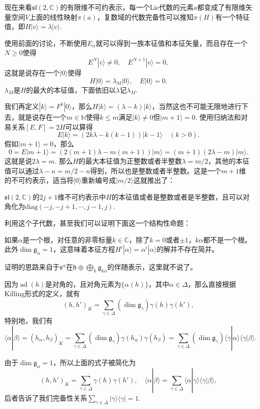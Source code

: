 \documentclass[11pt]{article}
\theoremstyle{definition}
\theoremstyle{plain}
\newcommand{\cc}{\mathbb{C}}
\newcommand{\lag}{{\mathfrak{g}}}
\DeclareMathOperator{\ad}{ad}
\begin{document}
\para 现在来看$\mathfrak{sl}(2,\cc)$的有限维不可约表示，每一个Lie代数的元素$a$都变成了有限维矢量空间$V$上面的线性映射$\pi(a)$，复数域的代数完备性可以推知$\pi(H)$有一个特征值，即$H|v\rangle=\lambda |v\rangle$.

使用前面的讨论，不断使用$E_\alpha$就可以得到一族本征值和本征矢量，而且存在一个$N\geq 0$使得
\[
	E^N|v\rangle\neq 0,\quad E^{N+1}|v\rangle =0,
\]
这就是说存在一个$|0\rangle$使得
\[
	H|0\rangle =\lambda_M |0\rangle,\quad E|0\rangle =0.
\]
$\lambda_M$是$H$的最大的本征值，下面依旧以$\lambda$记$\lambda_M$.

我们再定义$|k\rangle=F^k|0\rangle$，那么$H|k\rangle=(\lambda-k) |k\rangle$，当然这也不可能无限地进行下去，就是说存在一个$m\in \mathbb{N}$使得$k\leq m$满足$|k\rangle\neq 0$但$|m+1\rangle=0$. 使用归纳法和对易关系$[E,F]=2H$可以算得
\[
E|k\rangle=(2k\lambda -k(k-1)) |k-1\rangle\quad (k>0).
\]
假如$|m+1\rangle =0$，那么
\[
0=E|m+1\rangle=(2(m+1)\lambda -m(m+1)) |m\rangle =(m+1)(2\lambda-m)|m\rangle.
\]
这就是说$2\lambda=m$. 那么$H$的最大本征值为正整数或者半整数$\lambda=m/2$，其他的本征值可以通过$\lambda-n=m/2-n$得到，所以也是整数或者半整数。这是一个$m+1$维的不可约表示，适当将$|0\rangle$重新编号成$|m/2\rangle$这就推出了：

{\pro $\mathfrak{sl}(2,\cc)$的$2j+1$维不可约表示中$H$的本征值或者是整数或者是半整数，且可以对角化为$\mathrm{diag}(-j,-j+1,\cdots,j-1,j)$. \endpro}

利用这个子代数，甚至我们可以证明下面这一个结构性命题：

{\pro 如果$\alpha$是一个根，对任意的非零标量$k\in \cc$，除了$k=0$或者$\pm 1$，$k\alpha$都不是一个根。此外$\dim \lag_{\alpha}=1$，这意味着本征方程$H^i|\alpha\rangle = \alpha^i|\alpha\rangle$的解并不存在简并。\endpro}

证明的思路来自于$\mathfrak{s}^\alpha$在$\mathfrak{h} \oplus \bigoplus_k \lag_{k\alpha}$的伴随表示，这里就不说了。

\para 因为$\ad(h)$是对角的，且对角元素为$\{\alpha(h)\}$，其中$\alpha\in\Delta$，那么直接根据Killing形式的定义，就有
\[
	(h,h')_K=\sum_{\gamma \in \Delta}(\dim \lag_\gamma)\gamma(h)\gamma(h'),
\]
特别地，我们有
\[
	\langle \alpha|\beta \rangle=(h_\alpha,h_\beta)_K=\sum_{\gamma \in \Delta}(\dim \lag_\gamma)\gamma(h_\alpha)\gamma(h_\beta)=\sum_{\gamma \in \Delta}(\dim \lag_\gamma)\langle \gamma|\alpha\rangle\langle \gamma|\beta\rangle.
\]

由于$\dim \lag_{\alpha}=1$，所以上面的式子被简化为
\[
	(h,h')_K=\sum_{\gamma \in \Delta}\gamma(h)\gamma(h'),\quad \langle \alpha|\beta \rangle=\sum_{\gamma \in \Delta}\langle \alpha|\gamma\rangle\langle \gamma|\beta\rangle,
\]
后者告诉了我们完备性关系$\sum_{\gamma\in \Delta}|\gamma\rangle\langle \gamma|=1$.
\end{document}
